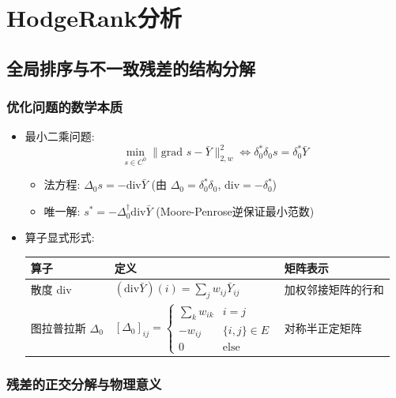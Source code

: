 \documentclass[a4paper]{article}
\begin{document}
\section{HodgeRank分析}
\subsection{全局排序与不一致残差的结构分解}

\subsubsection{优化问题的数学本质}

\begin{itemize}
    \item 最小二乘问题:
    $$
    \min_{s \in C^0} \| \text{grad } s - \bar{Y} \|_{2,w}^2 \iff \delta_0^* \delta_0 s = \delta_0^* \bar{Y}
    $$
    \begin{itemize}
        \item 法方程: $\Delta_0 s = -\text{div} \bar{Y}$ (由 $\Delta_0 = \delta_0^* \delta_0$, $\text{div} = -\delta_0^*$)
        \item 唯一解: $s^* = -\Delta_0^\dagger \text{div} \bar{Y}$ (Moore-Penrose逆保证最小范数)
    \end{itemize}
    
    \item 算子显式形式:
    \begin{table}[h]
        \centering
        \begin{tabular}{m{4cm} m{6cm} m{6cm}}
            \textbf{算子} & \textbf{定义} & \textbf{矩阵表示} \\
            \hline
            散度 div & $(\text{div} \bar{Y})(i) = \sum_j w_{ij} \bar{Y}_{ij}$ & 加权邻接矩阵的行和 \\
            \hline
            图拉普拉斯 $\Delta_0$ & 
            $[\Delta_0]_{ij} = 
            \begin{cases} 
                \sum_k w_{ik} & i = j \\
                -w_{ij} & \{i,j\} \in E \\
                0 & \text{else}
            \end{cases}$ & 对称半正定矩阵 \\
        \end{tabular}
    \end{table}
\end{itemize}
\subsubsection{残差的正交分解与物理意义}
\end{document}
